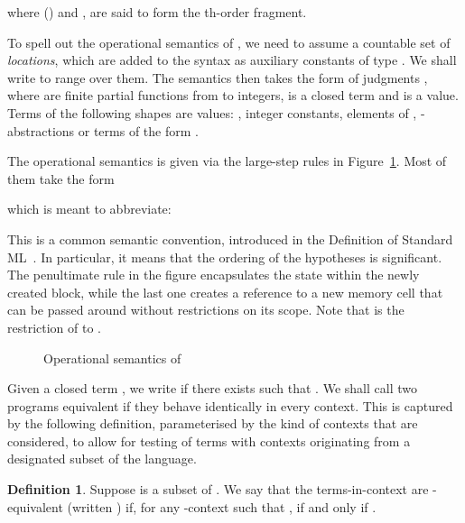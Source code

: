 \documentclass{CSML}
\theoremstyle{definition}\newtheorem{definition}[thm]{Definition}
\theoremstyle{definition}\newtheorem{example}[thm]{Example}
\theoremstyle{definition}\newtheorem{proposition}[thm]{Proposition}
\theoremstyle{definition}\newtheorem{lemma}[thm]{Lemma}
\theoremstyle{definition}\newtheorem{theorem}[thm]{Theorem}
\theoremstyle{definition}\newtheorem{corollary}[thm]{Corollary}
\theoremstyle{definition}\newtheorem{remark}[thm]{Remark}
\newcommand\nt[1]{#1}
\newcommand\cutout[1]{}
\begin{document}
where  () and ,
are said to form the th-order fragment.

To spell out the operational semantics of , we need to assume a countable set 
of \emph{locations}, which are added to the syntax as auxiliary constants of type .
We shall write  to range over them.
The semantics then takes the form of judgments , where  are
finite partial functions from  to integers,  is a \nt{closed} term and  is a value.
Terms of the following shapes are values:  , integer constants, elements of , 
-abstractions or terms of the form .

The operational semantics is given via the large-step rules in Figure~\ref{fig:opsem}. 
Most of them take the form 

which is meant to abbreviate:

This is a common semantic convention, introduced in the Definition of Standard ML~\cite{MTH90}.
In particular, it means that the ordering of the hypotheses is significant.
The penultimate rule in the figure encapsulates the state within the newly created block,
while the last one creates a reference to a new memory cell that can
be passed around without restrictions on its scope.
Note that 
is the restriction of  to .


\begin{figure}[t]
\renewcommand\arraystretch{2.5}

\caption{Operational semantics of \label{fig:opsem}}
\makebox[\textwidth][l]{\hrulefill}
\end{figure}

\cutout{
Here we only reproduce the two evaluation rules related to variable creation.

}

Given a closed term , we write  
if there exists  such that .
We shall call two programs equivalent if they behave identically 
in every context. This is captured by the following definition, 
parameterised by the kind of contexts that are considered,
to allow for testing of terms with contexts originating from a designated 
subset of the language.

\begin{definition}
Suppose  is a subset of .
We say that the terms-in-context  
are -equivalent (written )
if, for any -context  such that ,
 if and only if  .
\end{definition}
\end{document}
